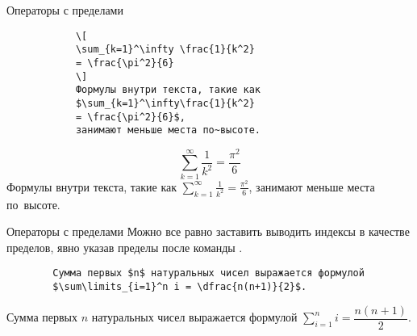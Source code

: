 \begin{frame}[fragile]{Операторы с пределами}
	\large
	\begin{center}
		
	\end{center}
	
	\normalsize
	\vspace{-0.5cm}
	\begin{minipage}{0.49\textwidth}
		\begin{verbatim}
			\[
			\sum_{k=1}^\infty \frac{1}{k^2}
			= \frac{\pi^2}{6}
			\]
			Формулы внутри текста, такие как 
			$\sum_{k=1}^\infty\frac{1}{k^2} 
			= \frac{\pi^2}{6}$,
			занимают меньше места по~высоте.
		\end{verbatim}
	\end{minipage}
	\begin{minipage}{0.49\textwidth}
		\Large
		\[
		\sum_{k=1}^\infty \frac{1}{k^2}
		= \frac{\pi^2}{6}
		\]
		Формулы внутри текста, такие как 
		$\sum_{k=1}^\infty\frac{1}{k^2} = \frac{\pi^2}{6}$,
		занимают меньше места по~высоте.
	\end{minipage}
	
\end{frame}

\begin{frame}[fragile]{Операторы с пределами}
	Можно все равно заставить выводить индексы в качестве пределов, явно указав пределы после команды \texttt{\limits}.
	
	\begin{verbatim}
		Сумма первых $n$ натуральных чисел выражается формулой 
		$\sum\limits_{i=1}^n i = \dfrac{n(n+1)}{2}$.  
	\end{verbatim}
	
	
	Сумма первых $n$ натуральных чисел выражается формулой $\sum\limits_{i=1}^n i = \dfrac{n(n+1)}{2}$.
	
\end{frame}



